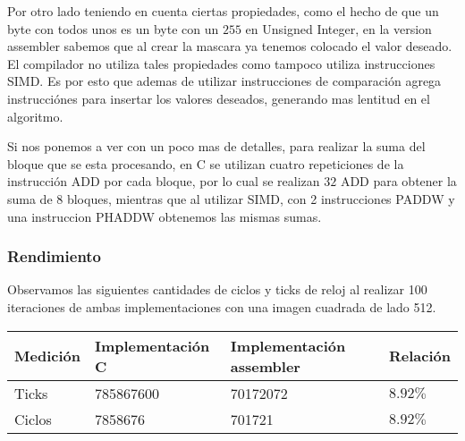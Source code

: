 Por otro lado teniendo en cuenta ciertas propiedades, como el hecho de que un byte con todos unos es un byte con un $255$ en Unsigned Integer, en la version assembler sabemos que al crear la mascara ya tenemos colocado el valor deseado. El compilador no utiliza tales propiedades como tampoco utiliza instrucciones SIMD. Es por esto que ademas de utilizar instrucciones de comparación agrega instrucciónes para insertar los valores deseados, generando mas lentitud en el algoritmo. 

Si nos ponemos a ver con un poco mas de detalles, para realizar la suma del bloque que se esta procesando, en C se utilizan cuatro repeticiones de la instrucción ADD por cada bloque, por lo cual se realizan $32$ ADD para obtener la suma de 8 bloques, mientras que al utilizar SIMD, con 2 instrucciones PADDW y una instruccion PHADDW obtenemos las mismas sumas.

\subsubsection{Rendimiento}

Observamos las siguientes cantidades de ciclos y ticks de reloj al realizar 100 iteraciones de ambas implementaciones con una imagen cuadrada de lado 512.

\begin{center}
    \begin{tabular}{|l|l|l|l|}
        \hline
        Medición & Implementación C & Implementación assembler & Relación \\
        \hline
        Ticks    & 785867600      & 70172072               & $8.92\%$ \\
        Ciclos   & 7858676        & 701721                 & $8.92\%$ \\
        \hline
    \end{tabular}
\end{center}